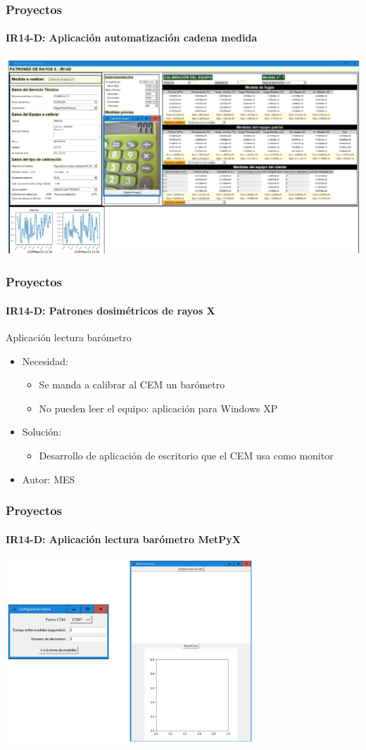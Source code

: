 \documentclass{beamer}
\newcommand{\highlight}[1]{{\color{blue} #1}}
\begin{document}
	\begin{frame}
		\frametitle{Proyectos}
		\framesubtitle{IR14-D: Aplicación automatización cadena medida}
		\centering
		\includegraphics[width=\textwidth]{IR14D_app_automatizacion}
	\end{frame}
	
	\begin{frame}
		\frametitle{Proyectos}
		\framesubtitle{IR14-D: Patrones dosimétricos de rayos X}
		Aplicación lectura barómetro
		\begin{itemize}
			\item Necesidad:
			\begin{itemize}
				\item Se manda a calibrar al CEM un \highlight{barómetro}
				\item No pueden leer el equipo: aplicación para \highlight{Windows XP}
			\end{itemize}
			\item Solución:
			\begin{itemize}
				\item Desarrollo de \highlight{aplicación de escritorio} que el CEM usa como monitor
			\end{itemize}
			\item Autor: MES
		\end{itemize}
	\end{frame}
	
	\begin{frame}
		\frametitle{Proyectos}
		\framesubtitle{IR14-D: Aplicación lectura barómetro MetPyX}
		\centering
		\includegraphics[width=0.7\textwidth]{IR14D_barometro}
	\end{frame}
	
\end{document}
